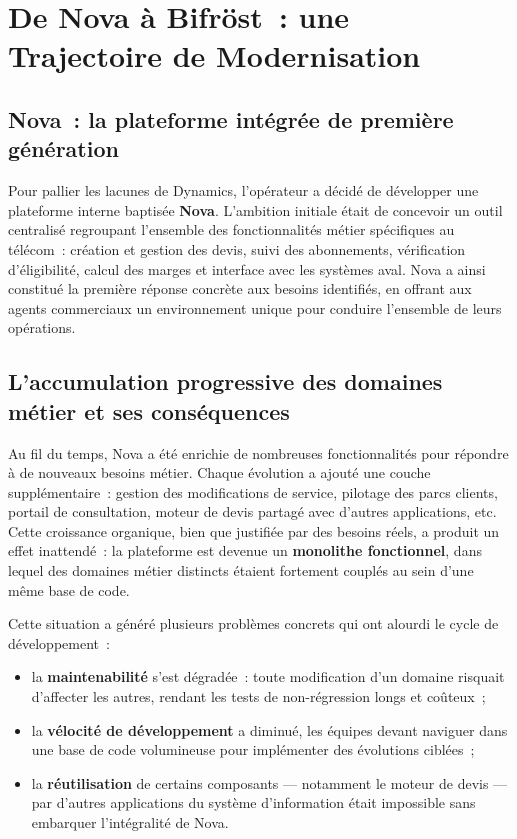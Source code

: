 \section{De Nova \`a Bifr\"ost~: une Trajectoire de Modernisation}

\subsection{Nova~: la plateforme int\'egr\'ee de premi\`ere g\'en\'eration}

Pour pallier les lacunes de Dynamics, l'op\'erateur a d\'ecid\'e de d\'evelopper une plateforme interne baptis\'ee \textbf{Nova}. L'ambition initiale \'etait de concevoir un outil centralis\'e regroupant l'ensemble des fonctionnalit\'es m\'etier sp\'ecifiques au t\'el\'ecom~: cr\'eation et gestion des devis, suivi des abonnements, v\'erification d'\'eligibilit\'e, calcul des marges et interface avec les syst\`emes aval. Nova a ainsi constitu\'e la premi\`ere r\'eponse concr\`ete aux besoins identifi\'es, en offrant aux agents commerciaux un environnement unique pour conduire l'ensemble de leurs op\'erations.

\subsection{L'accumulation progressive des domaines m\'etier et ses cons\'equences}

Au fil du temps, Nova a \'et\'e enrichie de nombreuses fonctionnalit\'es pour r\'epondre \`a de nouveaux besoins m\'etier. Chaque \'evolution a ajout\'e une couche suppl\'ementaire~: gestion des modifications de service, pilotage des parcs clients, portail de consultation, moteur de devis partag\'e avec d'autres applications, etc. Cette croissance organique, bien que justifi\'ee par des besoins r\'eels, a produit un effet inattend\'e~: la plateforme est devenue un \textbf{monolithe fonctionnel}, dans lequel des domaines m\'etier distincts \'etaient fortement coupl\'es au sein d'une m\^eme base de code.

Cette situation a g\'en\'er\'e plusieurs probl\`emes concrets qui ont alourdi le cycle de d\'eveloppement~:

\begin{itemize}[label=\textendash]
    \item la \textbf{maintenabilit\'e} s'est d\'egrad\'ee~: toute modification d'un domaine risquait d'affecter les autres, rendant les tests de non-r\'egression longs et co\^uteux~;
    \item la \textbf{v\'elocit\'e de d\'eveloppement} a diminu\'e, les \'equipes devant naviguer dans une base de code volumineuse pour impl\'ementer des \'evolutions cibl\'ees~;
    \item la \textbf{r\'eutilisation} de certains composants --- notamment le moteur de devis --- par d'autres applications du syst\`eme d'information \'etait impossible sans embarquer l'int\'egralit\'e de Nova.
\end{itemize}

